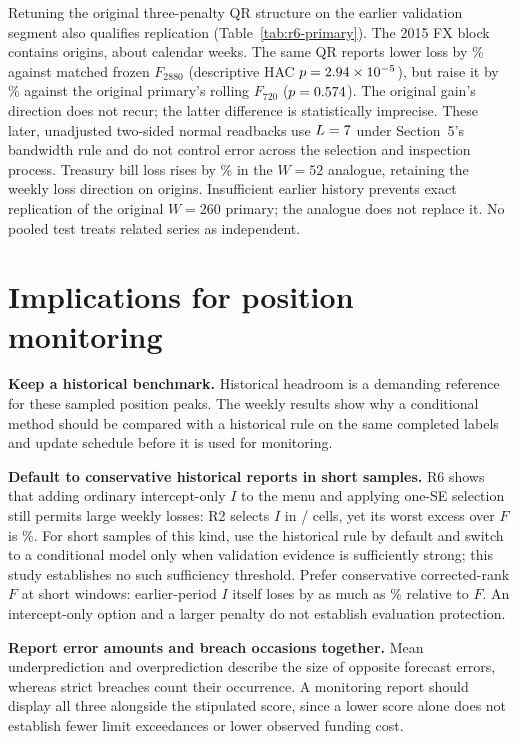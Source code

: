 Retuning the original three-penalty QR structure on the earlier validation segment also qualifies replication (Table~\ref{tab:r6-primary}). The 2015 FX block contains \RWritingFXN{} origins, about \RWritingFXWeeks{} calendar weeks. The same QR reports lower loss by \RWritingMatchedGain{}\% against matched frozen $F_{2880}$ (descriptive HAC $p=2.94\times10^{-5}{}$), but raise it by \RWritingOriginalExcess{}\% against the original primary's rolling $F_{720}$ ($p=0.574{}$). The original gain's direction does not recur; the latter difference is statistically imprecise. These later, unadjusted two-sided normal readbacks use $L=7{}$ under Section~5's bandwidth rule and do not control error across the selection and inspection process. Treasury bill loss rises by \RWritingTreasuryExcess{}\% in the $W=52$ analogue, retaining the weekly loss direction on \RWritingWeeklyN{} origins. Insufficient earlier history prevents exact replication of the original $W=260$ primary; the analogue does not replace it. No pooled test treats related series as independent.



\section{Implications for position monitoring}\label{sec:implications}
\textbf{Keep a historical benchmark.} Historical headroom is a demanding reference for these sampled position peaks. The weekly results show why a conditional method should be compared with a historical rule on the same completed labels and update schedule before it is used for monitoring.

\textbf{Default to conservative historical reports in short samples.} R6 shows that adding ordinary intercept-only $I$ to the menu and applying one-SE selection still permits large weekly losses: R2 selects $I$ in \RWritingISelected{}/\RWritingWeeklyCells{} cells, yet its worst excess over $F$ is \RWeeklyTwoWorst{}\%. For short samples of this kind, use the historical rule by default and switch to a conditional model only when validation evidence is sufficiently strong; this study establishes no such sufficiency threshold. Prefer conservative corrected-rank $F$ at short windows: earlier-period $I$ itself loses by as much as \RWeeklyIWorst{}\% relative to $F$. An intercept-only option and a larger penalty do not establish evaluation protection.

\textbf{Report error amounts and breach occasions together.} Mean underprediction and overprediction describe the size of opposite forecast errors, whereas strict breaches count their occurrence. A monitoring report should display all three alongside the stipulated score, since a lower score alone does not establish fewer limit exceedances or lower observed funding cost.

